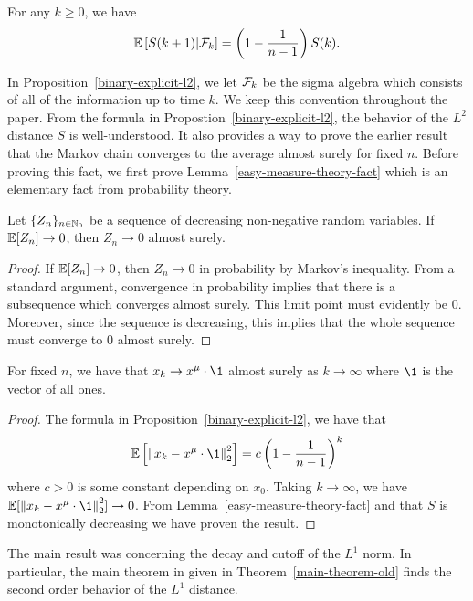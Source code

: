 \documentclass[12pt]{article}
\begin{document}
\begin{prop} \label{binary-explicit-l2}
	For any $k \geq 0$, we have 
	\[
		\mathbb{E} \left [ S(k+1) | \mathcal{F}_k \right ] = \left ( 1 - \frac{1}{n-1} \right ) S(k).
	\]	
\end{prop}

In Proposition~\ref{binary-explicit-l2}, we let $\mathcal{F}_k$ be the sigma algebra which consists of all of the information up to time $k$. We keep this convention throughout the paper. From the formula in Propostion~\ref{binary-explicit-l2}, the behavior of the $L^2$ distance $S$ is well-understood. It also provides a way to prove the earlier result that the Markov chain converges to the average almost surely for fixed $n$. Before proving this fact, we first prove Lemma~\ref{easy-measure-theory-fact} which is an elementary fact from probability theory. 

\begin{lem} \label{easy-measure-theory-fact}
	Let $\{Z_n\}_{n \in \mathbb{N}_0}$ be a sequence of decreasing non-negative random variables. If $\mathbb{E}[Z_n] \to 0$, then $Z_n \to 0$ almost surely. 
\end{lem}
\begin{proof}
	If $\mathbb{E}[Z_n] \to 0$, then $Z_n \to 0$ in probability by Markov's inequality. From a standard argument, convergence in probability implies that there is a subsequence which converges almost surely. This limit point must evidently be $0$. Moreover, since the sequence is decreasing, this implies that the whole sequence must converge to $0$ almost surely. 
\end{proof}

\begin{prop}
	For fixed $n$, we have that $x_k \to x^\mu \cdot \1$ almost surely as $k \to \infty$ where $\1$ is the vector of all ones. 
\end{prop}
\begin{proof}
	The formula in Proposition~\ref{binary-explicit-l2}, we have that 
	\[
		\EE \left [ \norm{x_k - x^\mu \cdot \1}_2^2 \right ] = c \left ( 1 - \frac{1}{n-1} \right )^k 
	\]
	where $c > 0$ is some constant depending on $x_0$. Taking $k \to \infty$, we have $\EE [ \norm{x_k - x^\mu \cdot \1}_2^2 ] \to 0$. From Lemma~\ref{easy-measure-theory-fact} and that $S$ is monotonically decreasing we have proven the result.
\end{proof}
The main result \cite{chatterjee2021phase} was concerning the decay and cutoff of the $L^1$ norm. In particular, the main theorem in \cite{chatterjee2021phase} given in Theorem~\ref{main-theorem-old} finds the second order behavior of the $L^1$ distance. 
\end{document}
